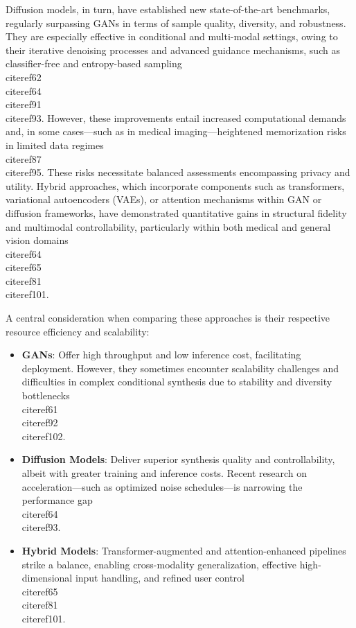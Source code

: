 \documentclass[11pt]{article}
\begin{document}
Diffusion models, in turn, have established new state-of-the-art benchmarks, regularly surpassing GANs in terms of sample quality, diversity, and robustness. They are especially effective in conditional and multi-modal settings, owing to their iterative denoising processes and advanced guidance mechanisms, such as classifier-free and entropy-based sampling \\cite{ref62}\\cite{ref64}\\cite{ref91}\\cite{ref93}. However, these improvements entail increased computational demands and, in some cases—such as in medical imaging—heightened memorization risks in limited data regimes \\cite{ref87}\\cite{ref95}. These risks necessitate balanced assessments encompassing privacy and utility. Hybrid approaches, which incorporate components such as transformers, variational autoencoders (VAEs), or attention mechanisms within GAN or diffusion frameworks, have demonstrated quantitative gains in structural fidelity and multimodal controllability, particularly within both medical and general vision domains \\cite{ref64}\\cite{ref65}\\cite{ref81}\\cite{ref101}.

A central consideration when comparing these approaches is their respective resource efficiency and scalability:

\begin{itemize}
    \item \textbf{GANs}: Offer high throughput and low inference cost, facilitating deployment. However, they sometimes encounter scalability challenges and difficulties in complex conditional synthesis due to stability and diversity bottlenecks \\cite{ref61}\\cite{ref92}\\cite{ref102}.
    \item \textbf{Diffusion Models}: Deliver superior synthesis quality and controllability, albeit with greater training and inference costs. Recent research on acceleration—such as optimized noise schedules—is narrowing the performance gap \\cite{ref64}\\cite{ref93}.
    \item \textbf{Hybrid Models}: Transformer-augmented and attention-enhanced pipelines strike a balance, enabling cross-modality generalization, effective high-dimensional input handling, and refined user control \\cite{ref65}\\cite{ref81}\\cite{ref101}.
\end{itemize}
\end{document}
